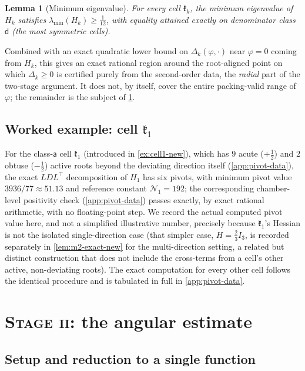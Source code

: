 \documentclass[11pt,reqno]{amsart}
\renewcommand{\_}{\origunderscore\allowbreak}
\numberwithin{equation}{section}
\theoremstyle{plain}
\newtheorem{lem}[thm]{Lemma}
\theoremstyle{definition}
\theoremstyle{remark}
\newcommand{\Cell}[1]{\mathfrak{k}_{#1}}     %
\newcommand{\tilt}{\varphi}                  %
\newcommand{\defect}{\Delta}                 %
\newcommand{\norm}[1]{\mathcal{N}_{#1}}      %
\newcommand{\stagetwo}{\textnormal{\scshape Stage ii}}
\begin{document}
\begin{lem}[Minimum eigenvalue]\label{lem:mineig-new}
For every cell $\Cell{k}$, the minimum eigenvalue of $H_k$ satisfies
$\lambda_{\min}(H_k)\ge\tfrac{1}{12}$, with equality attained exactly on
denominator class $\mathsf d$ (the most symmetric cells).
\end{lem}

Combined with an exact quadratic lower bound on $\defect_k(\tilt,\cdot)$
near $\tilt=0$ coming from $H_k$, this gives an exact rational region
around the root-aligned point on which $\defect_k\ge0$ is certified
purely from the second-order data, the \emph{radial} part of the
two-stage argument. It does not, by itself, cover the entire
packing-valid range of $\tilt$; the remainder is the subject of
\cref{sec:stage-two}.

\subsection{Worked example: cell $\Cell1$}

For the class-$\mathsf a$ cell $\Cell1$ (introduced in
\cref{ex:cell1-new}), which has $9$ acute ($+\tfrac12$) and $2$ obtuse
($-\tfrac12$) active roots beyond the deviating direction itself
(\cref{app:pivot-data}), the exact $LDL^\top$ decomposition of $H_1$ has
six pivots, with minimum pivot value $3936/77\approx51.13$ and
reference constant $\norm1=192$; the corresponding chamber-level
positivity check (\cref{app:pivot-data}) passes exactly, by exact
rational arithmetic, with no floating-point step. We record the actual
computed pivot value here, and not a simplified illustrative number, precisely because $\Cell1$'s Hessian is not the isolated
single-direction case (that simpler case, $H=\tfrac23I_3$, is recorded
separately in \cref{lem:m2-exact-new} for the multi-direction setting,
a related but distinct construction that does not include the
cross-terms from a cell's other active, non-deviating roots). The exact
computation for every other cell follows the identical procedure and
is tabulated in full in \cref{app:pivot-data}.
\section{\stagetwo: the angular estimate}\label{sec:stage-two}

\subsection{Setup and reduction to a single function}
\end{document}
